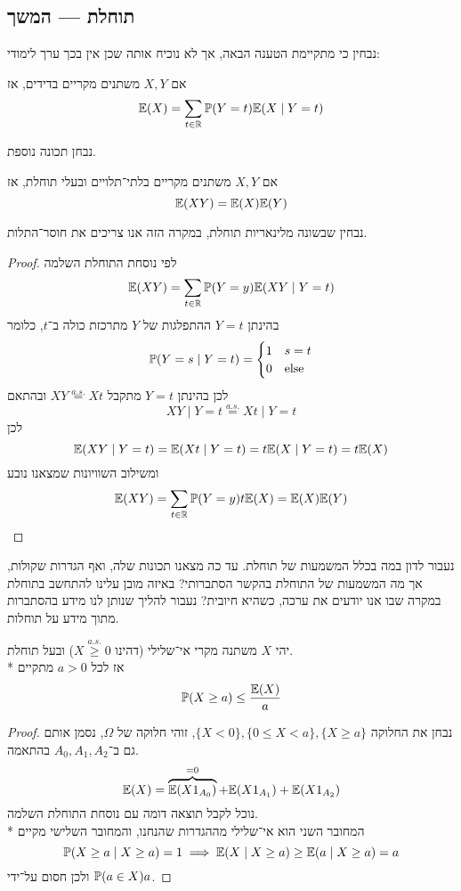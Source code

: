\subsection{תוחלת --- המשך}
נבחין כי מתקיימת הטענה הבאה, אך לא נוכיח אותה שכן אין בכך ערך לימודי:
\begin{proposition}
	אם $X, Y$ משתנים מקריים בדידים, אז
	\[
		\mathbb{E}(X) = \sum_{t \in \mathbb{R}} \mathbb{P}(Y = t) \mathbb{E}(X \mid Y = t)
	\]
\end{proposition}
נבחן תכונה נוספת.
\begin{proposition}
	אם $X, Y$ משתנים מקריים בלתי־תלויים ובעלי תוחלת, אז
	\[
		\mathbb{E}(X Y) = \mathbb{E}(X) \mathbb{E}(Y)
	\]
\end{proposition}
נבחין שבשונה מלינאריות תוחלת, במקרה הזה אנו צריכים את חוסר־התלות.
\begin{proof}
	לפי נוסחת התוחלת השלמה
	\[
		\mathbb{E}(XY) = \sum_{t \in \mathbb{R}} \mathbb{P}(Y = y) \mathbb{E}(XY \mid Y = t)
	\]
	בהינתן $Y = t$ ההתפלגות של $Y$ מתרכזת כולה ב־$t$, כלומר
	\[
		\mathbb{P}(Y = s \mid Y = t) = \begin{cases}
			1 & s = t \\
			0 & \text{else}
		\end{cases}
	\]
	לכן בהינתן $Y = t$ מתקבל $XY \overset{a.s.}{=} Xt$ ובהתאם
	\[
		XY \mid Y = t \overset{a.s.}{=} Xt \mid Y = t
	\]
	לכן
	\[
		\mathbb{E}(XY \mid Y = t)
		= \mathbb{E}(Xt \mid Y = t)
		= t \mathbb{E}(X \mid Y = t)
		= t \mathbb{E}(X)
	\]
	ומשילוב השוויונות שמצאנו נובע
	\[
		\mathbb{E}(XY)
		= \sum_{t \in \mathbb{R}} \mathbb{P}(Y = y) t \mathbb{E}(X)
		= \mathbb{E}(X) \mathbb{E}(Y)
	\]
\end{proof}
נעבור לדון במה בכלל המשמעות של תוחלת.
עד כה מצאנו תכונות שלה, ואף הגדרות שקולות, אך מה המשמעות של התוחלת בהקשר הסתברותי?
באיזה מובן עלינו להתחשב בתוחלת במקרה שבו אנו יודעים את ערכה, כשהיא חיובית?
נעבור להליך שנותן לנו מידע בהסתברות מתוך מידע על תוחלות.
\begin{theorem}\label{markov_inequality}
	יהי $X$ משתנה מקרי אי־שלילי (דהינו $X \overset{a.s.}{\ge} 0$) ובעל תוחלת. \\*
	אז לכל $a > 0$ מתקיים
	\[
		\mathbb{P}(X \ge a) \le \frac{\mathbb{E}(X)}{a}
	\]
\end{theorem}
\begin{proof}
	נבחן את החלוקה $\{X < 0\}, \{0 \le X < a\}, \{X \ge a\}$, זוהי חלוקה של $\Omega$, נסמן אותם גם ב־$A_0, A_1, A_2$ בהתאמה.
	\[
		\mathbb{E}(X) = \overbrace{\mathbb{E}(X 1_{A_0})}^{=0} + \mathbb{E}(X 1_{A_1}) + \mathbb{E}(X 1_{A_2})
	\]
	נוכל לקבל תוצאה דומה עם נוסחת התוחלת השלמה. \\*
	המחובר השני הוא אי־שלילי מההגדרות שהנחנו, והמחובר השלישי מקיים
	\[
		\mathbb{P}(X \ge a \mid X \ge a) = 1
		\implies \mathbb{E}(X \mid X \ge a) \ge \mathbb{E}(a \mid X \ge a) = a
	\]
	ולכן חסום על־ידי $\mathbb{P}(a \in X) a$.
\end{proof}

